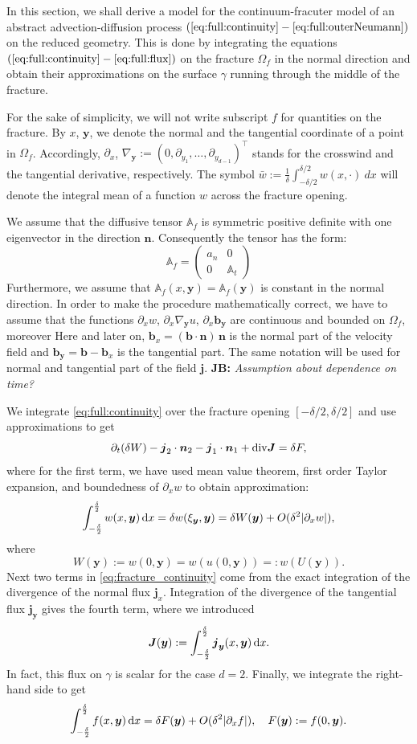 \documentclass[a4paper]{article}
\def\prtl{\partial}
\def\vc#1{\mathbf{\boldsymbol{#1}}}     %
\def\tn#1{{\mathbb{#1}}}    %
\def\abs#1{\lvert#1\rvert}
\def\div{{\rm div}}
\def\grad{\nabla}
\def\d {\,{\rm d}}
\newcommand{\note}[2]{{\color{blue} \textbf{ #1:} \textit{#2}}}
\begin{document}
In this section, we shall derive a model for the continuum-fracuter model of an abstract advection-diffusion process 
$(\ref{eq:full:continuity}-\ref{eq:full:outerNeumann})$
on the reduced geometry. This is done by integrating the equations $(\ref{eq:full:continuity}-\ref{eq:full:flux})$ on the fracture $\Omega_f$
in the normal direction and obtain their approximations on the surface $\gamma$ running through the middle of the fracture.

For the sake of simplicity, we will not write subscript $f$ for quantities on the fracture. 
By $x$, $\vc y$, we denote the normal and the tangential coordinate of a point in $\Omega_f$.
Accordingly, $\partial_x$, $\nabla_{\vc y}:=(0,\partial_{y_1},\ldots,\partial_{y_{d-1}})^\top$ stands for 
the crosswind and the tangential derivative, respectively. 
The symbol $\bar w:=\frac1\delta\int_{-\delta/2}^{\delta/2} w(x,\cdot)~dx$ will denote the integral mean of a function $w$ across the fracture opening.


We assume that the diffusive tensor $\tn A_f$ is symmetric positive definite 
with one eigenvector in the direction $\vc n$. Consequently the tensor has the form:
\[
 \tn A_f = \begin{pmatrix} 
            a_n & 0  \\
            0 & \tn A_t
       \end{pmatrix}
\]
Furthermore, we assume that $\tn A_f(x, \vc y)=\tn A_f(\vc y)$ is constant in the normal direction.
In order to make the procedure mathematically correct, we have to assume that the functions
$\prtl_x w$, $\prtl_x \grad_{\vc y} u$, $\prtl_x \vc b_{\vc y}$ are continuous and bounded on $\Omega_f$, moreover
Here and later on, 
$\vc b_x=(\vc b \cdot \vc n)\, \vc n$ is the normal part of the velocity field and $\vc b_{\vc y} = \vc b - \vc b_x$ is the tangential part.
The same notation will be used for normal and tangential part of the field $\vc j$.
\note{JB}{Assumption about dependence on time?}

We integrate \eqref{eq:full:continuity} over the fracture opening $[-\delta/2,\delta/2]$ and use approximations to get
\begin{equation}
    \label{eq:fracture_continuity}
   \prtl_t (\delta W) - \vc j_2 \cdot \vc n_2 - \vc j_1 \cdot \vc n_1 + \div \vc J = \delta F,
\end{equation}
where for the first term, we have used mean value theorem, first order Taylor expansion, 
and boundedness of $\prtl_x w$ to obtain approximation:
\[
    \int_{-\frac\delta2}^{\frac\delta2} w(x,\vc y) \d x=\delta w(\xi_{\vc y}, \vc y) = \delta W(\vc y) + O(\delta^2\abs{\prtl_x w}),
\]
where
\[
    W(\vc y):=w(0,\vc y)=w(u(0,\vc y))=:w(U(\vc y)).
\]
Next two terms in \eqref{eq:fracture_continuity} come from the exact integration 
of the divergence of the normal flux $\vc j_x$.
Integration of the divergence of the tangential flux $\vc j_{\vc y}$ gives the fourth term, where we introduced
\[
\vc J(\vc y) := \int_{-\frac\delta2}^{\frac\delta2} \vc j_{\vc y}(x, \vc y) \d x.
\]
In fact, this flux on $\gamma$ is scalar for the case $d=2$. Finally, we integrate the right-hand side to get 
\[
    \int_{-\frac\delta2}^{\frac\delta2} f(x,\vc y) \d x = \delta F(\vc y) + O(\delta^2\abs{\prtl_x f}),\quad F(\vc y):=f(0,\vc y). 
\]
\end{document}
